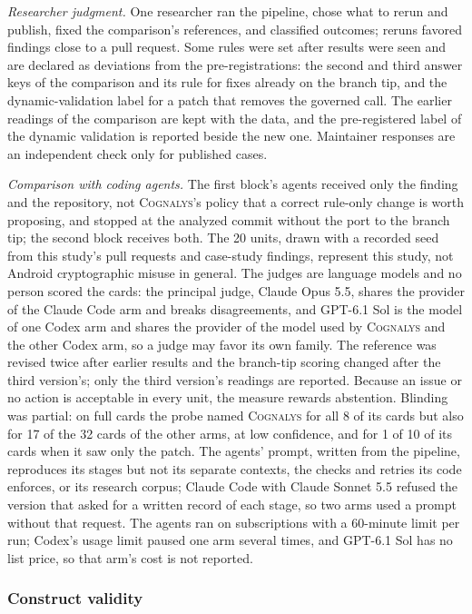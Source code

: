 \documentclass[conference]{IEEEtran}
\newcommand{\system}{\textsc{Cognalys}}
\begin{document}
\emph{Researcher judgment.} One researcher ran the pipeline, chose what to
rerun and publish, fixed the comparison's references, and classified outcomes;
reruns favored findings close to a pull request.
Some rules were set after results were seen and are declared as deviations
from the pre-registrations: the second and third answer keys of the comparison
and its rule for fixes already on the branch tip, and the dynamic-validation
label for a patch that removes the governed call. The earlier readings of the
comparison are kept with the data, and the pre-registered label of the dynamic
validation is reported beside the new one. Maintainer responses are an
independent check only for published cases.

\emph{Comparison with coding agents.} The first block's agents received only
the finding and the repository, not \system{}'s policy that a correct
rule-only change is worth proposing, and stopped at the analyzed commit
without the port to the branch tip; the second block receives both. The 20 units, drawn with a
recorded seed from this study's pull requests and case-study findings,
represent this study, not Android cryptographic misuse in general. The
judges are language models and no person scored the cards: the principal
judge, Claude Opus 5.5, shares the provider of the Claude Code arm and breaks
disagreements, and GPT-6.1 Sol is the model of one Codex arm and shares the
provider of the model used by \system{} and the other Codex arm, so a judge may
favor its own family. The reference was revised twice after earlier results
and the branch-tip scoring changed after the third version's; only the third
version's readings are reported. Because an issue or no action is acceptable in every
unit, the measure rewards abstention. Blinding was partial: on full cards the
probe named \system{} for all 8 of its cards but also for 17 of the 32 cards of
the other arms, at low confidence, and for 1 of 10 of its cards when it saw only
the patch. The agents' prompt, written from the pipeline, reproduces its
stages but not its separate contexts, the checks and retries its code
enforces, or its research corpus; Claude Code with Claude Sonnet 5.5 refused
the version that asked for a written record of each stage, so two arms used a
prompt without that request. The agents ran on subscriptions with a 60-minute
limit per run; Codex's usage limit paused one arm several times, and GPT-6.1
Sol has no list price, so that arm's cost is not reported.

\subsubsection{Construct validity}
\end{document}
